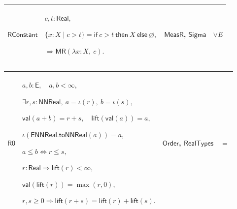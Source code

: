 \documentclass[11pt]{amsart}
\newlength{\FTCFourColumnBody}
\begin{document}
{\begin{tabular}
\end{tabular}%
\par\setlength{\parskip}{0pt}\nointerlineskip
\noindent
\begin{tabular}{|@{}>{\centering\arraybackslash}m{0.078431\FTCFourColumnBody}|>{\centering\arraybackslash}m{0.535947\FTCFourColumnBody}|>{\centering\arraybackslash}m{0.281045\FTCFourColumnBody}|>{\centering\arraybackslash}m{0.104575\FTCFourColumnBody}|}\hline
\hypertarget{dct:RConstant}{$\displaystyle \textsf{RConstant}$} & $\displaystyle c,t:\textsf{Real},$\par
$\displaystyle \{x:X\mid c>t\}=\textsf{if}\ c>t\ \textsf{then}\ X\ \textsf{else}\ \varnothing,$\par
$\displaystyle \Rightarrow\textsf{MR}(\lambda x:X,\ c).$ & \hyperlink{dctdef:MeasR}{$\displaystyle \textsf{MeasR}$}, \hyperlink{ax:Sigma}{$\displaystyle \textsf{Sigma}$} & $\displaystyle \lor E$\\ \hline
\end{tabular}%
\par\setlength{\parskip}{0pt}\nointerlineskip
\noindent
\begin{tabular}{|@{}>{\centering\arraybackslash}m{0.078431\FTCFourColumnBody}|>{\centering\arraybackslash}m{0.535947\FTCFourColumnBody}|>{\centering\arraybackslash}m{0.281045\FTCFourColumnBody}|>{\centering\arraybackslash}m{0.104575\FTCFourColumnBody}|}\hline
\hypertarget{dct:R0}{$\displaystyle \textsf{R0}$} & $\displaystyle a,b:\textsf{E},\quad a,b<\infty,$\par
$\displaystyle \exists r,s:\textsf{NNReal},\ a=\iota(r),\ b=\iota(s),$\par
$\displaystyle \textsf{val}(a+b)=r+s,\quad\textsf{lift}(\textsf{val}(a))=a,$\par
$\displaystyle \iota(\textsf{ENNReal.toNNReal}(a))=a,$\par
$\displaystyle a\le b\Longleftrightarrow r\le s,$\par
$\displaystyle r:\textsf{Real}\Rightarrow\textsf{lift}(r)<\infty,$\par
$\displaystyle \textsf{val}(\textsf{lift}(r))=\max(r,0),$\par
$\displaystyle r,s\ge0\Rightarrow\textsf{lift}(r+s)=\textsf{lift}(r)+\textsf{lift}(s).$ & \hyperlink{ax:Order}{$\displaystyle \textsf{Order}$}, \hyperlink{dctdef:RealTypes}{$\displaystyle \textsf{RealTypes}$} & $\displaystyle =$\\ \hline
\end{tabular}%
\par\setlength{\parskip}{0pt}\nointerlineskip
}
\end{document}
